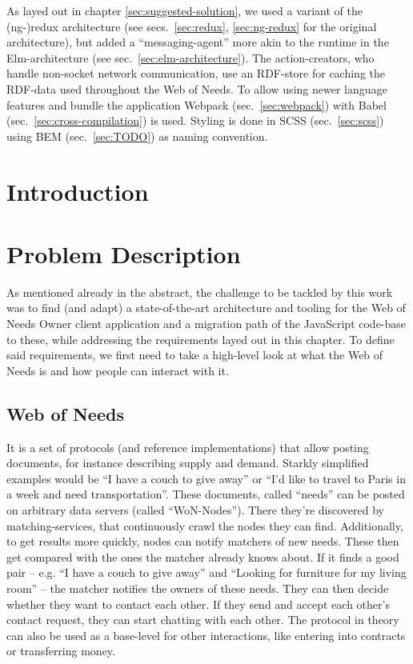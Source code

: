 \documentclass[a4paper,,tablecaptionabove]{scrbook}
\begin{document}
As layed out in chapter \ref{sec:suggested-solution}, we used a variant
of the (ng-)redux architecture (see
secs.~\ref{sec:redux}, \ref{sec:ng-redux} for the original
architecture), but added a \enquote{messaging-agent} more akin to the
runtime in the Elm-architecture (see sec.~\ref{sec:elm-architecture}).
The action-creators, who handle non-socket network communication, use an
RDF-store for caching the RDF-data used throughout the Web of Needs. To
allow using newer language features and bundle the application Webpack
(sec.~\ref{sec:webpack}) with Babel (sec.~\ref{sec:cross-compilation})
is used. Styling is done in SCSS (sec.~\ref{sec:scss}) using BEM
(sec.~\ref{sec:TODO}) as naming convention.

\hypertarget{sec:intro}{%
\chapter{Introduction}\label{sec:intro}}

\hypertarget{sec:probdescr}{%
\chapter{Problem Description}\label{sec:probdescr}}

As mentioned already in the abstract, the challenge to be tackled by
this work was to find (and adapt) a state-of-the-art architecture and
tooling for the Web of Needs Owner client application and a migration
path of the JavaScript code-base to these, while addressing the
requirements layed out in this chapter. To define said requirements, we
first need to take a high-level look at what the Web of Needs is and how
people can interact with it.

\hypertarget{sec:web-of-needs}{%
\section{Web of Needs}\label{sec:web-of-needs}}

It is a set of protocols (and reference implementations) that allow
posting documents, for instance describing supply and demand. Starkly
simplified examples would be \enquote{I have a couch to give away} or
\enquote{I'd like to travel to Paris in a week and need transportation}.
These documents, called \enquote{needs} can be posted on arbitrary data
servers (called \enquote{WoN-Nodes}). There they're discovered by
matching-services, that continuously crawl the nodes they can find.
Additionally, to get results more quickly, nodes can notify matchers of
new needs. These then get compared with the ones the matcher already
knows about. If it finds a good pair -- e.g. \enquote{I have a couch to
give away} and \enquote{Looking for furniture for my living room} -- the
matcher notifies the owners of these needs. They can then decide whether
they want to contact each other. If they send and accept each other's
contact request, they can start chatting with each other. The protocol
in theory can also be used as a base-level for other interactions, like
entering into contracts or transferring money.
\end{document}
